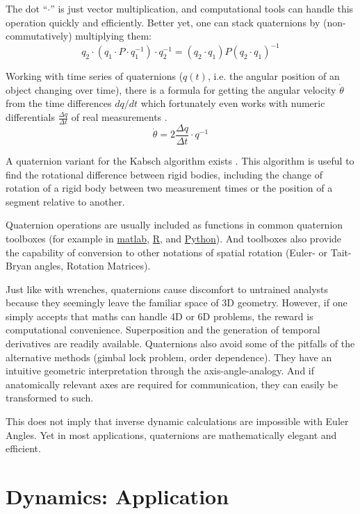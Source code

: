 The dot ``\(\cdot\)'' is just vector multiplication, and computational tools can handle this operation quickly and efficiently.
Better yet, one can stack quaternions by (non-commutatively) multiplying them:
\[ q_2 \cdot \left( q_1\cdot P\cdot q_1^{-1}\right) \cdot q_2^{-1} = (q_2\cdot q_1) P (q_2\cdot q_1)^{-1} \]

Working with time series of quaternions (\(q(t)\), i.e. the angular position of an object changing over time), there is a formula for getting the angular velocity \(\dot \theta\) from the time differences \(dq/dt\) which fortunately even works with numeric differentials \(\frac{\Delta q}{\Delta t}\) of real measurements \citep{Baker1999}.
\[\dot \theta = 2 \frac{\Delta q}{\Delta t} \cdot q^{-1} \]

A quaternion variant for the Kabsch algorithm exists \citep{Kabsch1976,Lawrence2019,Kneller1991}.
This algorithm is useful to find the rotational difference between rigid bodies, including the change of rotation of a rigid body between two measurement times or the position of a segment relative to another.


Quaternion operations are usually included as functions in common quaternion toolboxes (for example in \href{https://www.mathworks.com/discovery/quaternion.html}{matlab}, \href{https://cran.r-project.org/web/packages/onion/onion.pdf}{R}, and \href{https://pypi.org/project/numpy-quaternion}{Python}).
And toolboxes also provide the capability of conversion to other notations of spatial rotation (Euler- or Tait-Bryan angles, Rotation Matrices).


Just like with wrenches, quaternions cause discomfort to untrained analysts because they seemingly leave the familiar space of 3D geometry.
However, if one simply accepts that maths can handle 4D or 6D problems, the reward is computational convenience.
Superposition and the generation of temporal derivatives are readily available.
Quaternions also avoid some of the pitfalls of the alternative methods (gimbal lock problem, order dependence).
They have an intuitive geometric interpretation through the axis-angle-analogy.
And if anatomically relevant axes are required for communication, they can easily be transformed to such.

This does not imply that inverse dynamic calculations are impossible with Euler Angles.
Yet in most applications, quaternions are mathematically elegant and efficient.


\section{Dynamics: Application}
\label{sec:orgf95e0c2}

